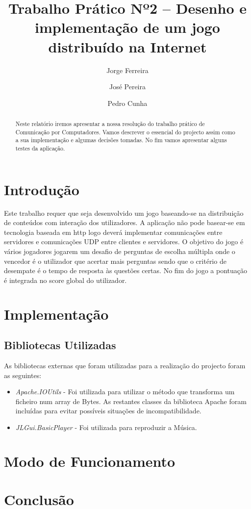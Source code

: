 \documentclass{llncs}
\begin{document}
\title{Trabalho Prático Nº2 – Desenho e implementação de um jogo distribuído na Internet}
\author{Jorge Ferreira \and José Pereira \and  Pedro Cunha}
\maketitle

\begin{abstract}
Neste relatório iremos apresentar a nossa resolução do trabalho prático de Comunicação por Computadores.
Vamos descrever o essencial do projecto assim como a sua implementação e algumas decisões tomadas. No fim vamos apresentar alguns testes da aplicação.
\end{abstract}

\section{Introdução}
Este trabalho requer que seja desenvolvido um jogo baseando-se na distribuição de conteúdos com interação dos utilizadores. A aplicação não pode basear-se em tecnologia baseada em http logo deverá implementar comunicações entre servidores e comunicações UDP entre clientes e servidores. O objetivo do jogo é vários jogadores jogarem um desafio de perguntas de escolha múltipla onde o vencedor é o utilizador que acertar mais perguntas sendo que o critério de desempate é o tempo de resposta às questões certas. No fim do jogo a pontuação é integrada no score global do utilizador.

\section{Implementação}
\subsection{Bibliotecas Utilizadas}
As bibliotecas externas que foram utilizadas para a realização do projecto foram as seguintes:
\begin{itemize}
\item \emph{Apache.IOUtils} - Foi utilizada para utilizar o método que transforma um ficheiro num array de Bytes. As restantes classes da biblioteca Apache foram incluídas para evitar possíveis situações de incompatibilidade.
\item \emph{JLGui.BasicPlayer} - Foi utilizada para reproduzir a Música.
\end{itemize}
\section{Modo de Funcionamento}
\section{Conclusão}
\end{document}
